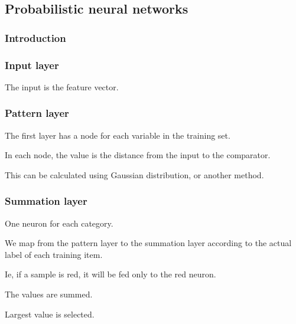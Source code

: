 
\subsection{Probabilistic neural networks}

\subsubsection{Introduction}

\subsubsection{Input layer}

The input is the feature vector.

\subsubsection{Pattern layer}

The first layer has a node for each variable in the training set.

In each node, the value is the distance from the input to the comparator.

This can be calculated using Gaussian distribution, or another method.

\subsubsection{Summation layer}

One neuron for each category.

We map from the pattern layer to the summation layer according to the actual label of each training item.

Ie, if a sample is red, it will be fed only to the red neuron.

The values are summed.

Largest value is selected.

